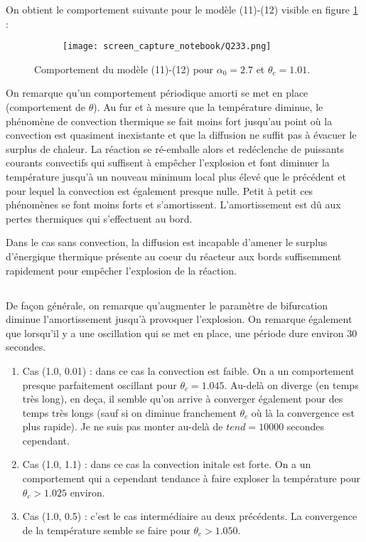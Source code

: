 \documentclass[10pt,a4paper]{report}
\begin{document}
On obtient le comportement suivante pour le modèle (11)-(12) visible en figure \ref{fig:comportement_Q2.3.3} :

\begin{figure}
		\centering
		\begin{subfigure}{}
        	\texttt{[image: screen\_capture\_notebook/Q233.png]}
    	\end{subfigure}
		
   	\caption{Comportement du modèle (11)-(12) pour $\alpha_0 = 2.7$ et $\theta_c = 1.01$.}
    \label{fig:comportement_Q2.3.3}
\end{figure}

On remarque qu'un comportement périodique amorti se met en place (comportement de $\theta$). Au fur et à mesure que la température diminue, le phénomène de convection thermique se fait moins fort jusqu'au point où la convection est quasiment inexistante et que la diffusion ne suffit pas à évacuer le surplus de chaleur. La réaction se ré-emballe alors et redéclenche de puissants courants convectifs qui suffisent à empêcher l'explosion et font diminuer la température jusqu'à un nouveau minimum local plus élevé que le précédent et pour lequel la convection est également presque nulle. Petit à petit ces phénomènes se font moins forts et s'amortissent. L'amortissement est dû aux pertes thermiques qui s'effectuent au bord.

Dans le cas sans convection, la diffusion est incapable d'amener le surplus d'énergique thermique présente au coeur du réacteur aux bords suffisemment rapidement pour empêcher l'explosion de la réaction.

\subsection{} %
\subsubsection{} %

De façon générale, on remarque qu'augmenter le paramètre de bifurcation diminue l'amortissement jusqu'à provoquer l'explosion. On remarque également que lorsqu'il y a une oscillation qui se met en place, une période dure environ 30 secondes.	

\begin{enumerate}
	\item Cas (1.0, 0.01) : dans ce cas la convection est faible. On a un comportement presque parfaitement oscillant pour $\theta_c = 1.045$. Au-delà on diverge (en temps très long), en deça, il semble qu'on arrive à converger également pour des temps très longs (sauf si on diminue franchement $\theta_c$ où là la convergence est plus rapide). Je ne suis pas monter au-delà de $tend = 10000$ secondes cependant.
	\item Cas (1.0, 1.1) : dans ce cas la convection initale est forte. On a un comportement qui a cependant tendance à faire exploser la température pour  $\theta_c > 1.025$ environ.
	\item Cas (1.0, 0.5) : c'est le cas intermédiaire au deux précédents. La convergence de la température semble se faire pour $\theta_c > 1.050$. 
\end{enumerate}
\end{document}
